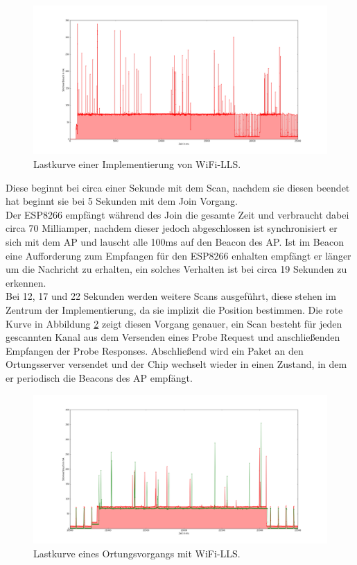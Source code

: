 \begin{figure}[h!]
  \centering
	\includegraphics[width=\textwidth]{plots/wifills.png}
  \caption{Lastkurve einer Implementierung von WiFi-LLS.}
  \label{fig:wifills}
\end{figure}

Diese beginnt bei circa einer Sekunde mit dem Scan, nachdem sie diesen beendet hat beginnt sie bei 5 Sekunden mit dem Join Vorgang.\\
Der ESP8266 empfängt während des Join die gesamte Zeit und verbraucht dabei circa 70 Milliamper, nachdem dieser jedoch abgeschlossen ist synchronisiert er sich mit dem AP und lauscht alle 100ms auf den Beacon des AP.
Ist im Beacon eine Aufforderung zum Empfangen für den ESP8266 enhalten empfängt er länger um die Nachricht zu erhalten, ein solches Verhalten ist bei circa 19 Sekunden zu erkennen.\\
Bei 12, 17 und 22 Sekunden werden weitere Scans ausgeführt, diese stehen im Zentrum der Implementierung, da sie implizit die Position bestimmen.
Die rote Kurve in Abbildung \ref{fig:wifillssendv} zeigt diesen Vorgang genauer, ein Scan besteht für jeden gescannten Kanal aus dem Versenden eines Probe Request und anschließenden Empfangen der Probe Responses. 
Abschließend wird ein Paket an den Ortungsserver versendet und der Chip wechselt wieder in einen Zustand, in dem er periodisch die Beacons des AP empfängt.\\

\begin{figure}[h!]
  \centering
	\includegraphics[width=\textwidth]{plots/wifillssendv.png}
  \caption{Lastkurve eines Ortungsvorgangs mit WiFi-LLS.}
  \label{fig:wifillssendv}
\end{figure}

